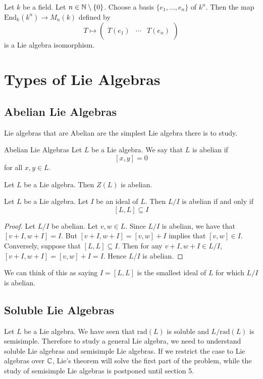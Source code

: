 \documentclass[a4paper]{article}
\begin{document}
\begin{prp}{}{} Let $k$ be a field. Let $n\in\mathbb{N}\setminus\{0\}$. Choose a basis $\{e_1,\dots,e_n\}$ of $k^n$. Then the map $\text{End}_k(k^n)\to M_n(k)$ defined by $$T\mapsto\begin{pmatrix}&&\\
T(e_1) & \cdots & T(e_n)\\
&&
\end{pmatrix}$$ is a Lie algebra isomorphism. 
\end{prp}

\pagebreak
\section{Types of Lie Algebras}
\subsection{Abelian Lie Algebras}
Lie algebras that are Abelian are the simplest Lie algebra there is to study. 

\begin{defn}{Abelian Lie Algebras}{} Let $L$ be a Lie algebra. We say that $L$ is abelian if $$[x,y]=0$$ for all $x,y\in L$. 
\end{defn}

\begin{lmm}{}{} Let $L$ be a Lie algebra. Then $Z(L)$ is abelian. 
\end{lmm}

\begin{lmm}{}{} Let $L$ be a Lie algebra. Let $I$ be an ideal of $L$. Then $L/I$ is abelian if and only if $$[L,L]\subseteq I$$ \tcbline
\begin{proof}
Let $L/I$ be abelian. Let $v,w\in L$. Since $L/I$ is abelian, we have that $[v+I,w+I]=I$. But $[v+I,w+I]=[v,w]+I$ implies that $[v,w]\in I$. Conversely, suppose that $[L,L]\subseteq I$. Then for any $v+I,w+I\in L/I$, $[v+I,w+I]=[v,w]+I=I$. Hence $L/I$ is abelian. 
\end{proof}
\end{lmm}

We can think of this as saying $I=[L,L]$ is the smallest ideal of $L$ for which $L/I$ is abelian. 

\subsection{Soluble Lie Algebras}
Let $L$ be a Lie algebra. We have seen that $\text{rad}(L)$ is soluble and $L/\text{rad}(L)$ is semisimple. Therefore to study a general Lie algebra, we need to understand soluble Lie algebras and semisimple Lie algebras. If we restrict the case to Lie algebras over $\mathbb{C}$, Lie's theorem will solve the first part of the problem, while the study of semisimple Lie algebras is postponed until section 5. 
\end{document}
